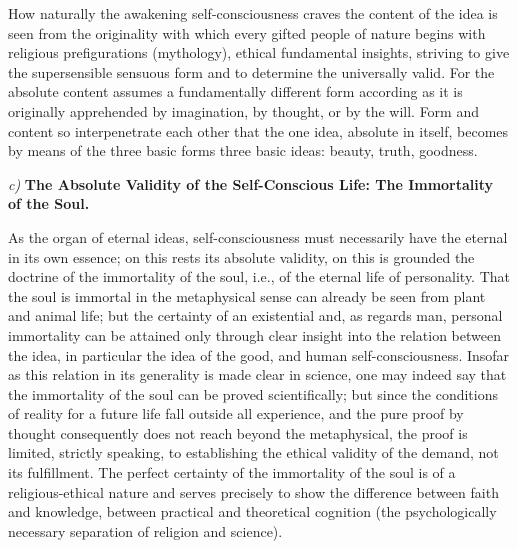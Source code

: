 \documentclass[12pt,a4paper,openany]{book}
\newcommand{\opage}[1]{\marginnote{\footnotesize\textit{[#1]}}}
\begin{document}
How naturally the awakening self-consciousness craves
\opage{8}the content of the idea is seen from the originality with which every gifted people of nature begins with
religious prefigurations (mythology), ethical fundamental insights, striving to give the supersensible sensuous form and
to determine the universally valid. For the absolute content assumes a fundamentally different form according as it is
originally apprehended by imagination, by thought, or by the will. Form and content so interpenetrate each other that
the one idea, absolute in itself, becomes by means of the three basic forms three basic ideas: beauty, truth, goodness.

\begin{center}
\textit{c)} \textbf{The Absolute Validity of the Self-Conscious Life: The Immortality}\\
\textbf{of the Soul.}
\end{center}

As the organ of eternal ideas, self-consciousness must necessarily have the eternal in its own essence; on this rests
its absolute validity, on this is grounded the doctrine of the immortality of the soul, i.e., of the eternal life of
personality. That the soul is immortal in the metaphysical sense can already be seen from plant and animal life; but the
certainty of an existential and, as regards man, personal immortality can be attained only through clear insight into
the relation between the idea, in particular the idea of the good, and human self-consciousness. Insofar as this
relation in its generality is made clear in science, one may indeed say that the immortality of the soul can be proved
scientifically; but since the conditions of reality for a future life fall outside all experience, and the pure proof
by thought consequently does not reach beyond the metaphysical, the proof is limited, strictly speaking, to establishing
the ethical validity of the demand, not its fulfillment. The perfect certainty of the immortality of the soul is of a
religious-ethical nature and serves precisely to show the difference between faith and knowledge, between practical and
theoretical cognition (the psychologically necessary separation of religion and science).
\end{document}
